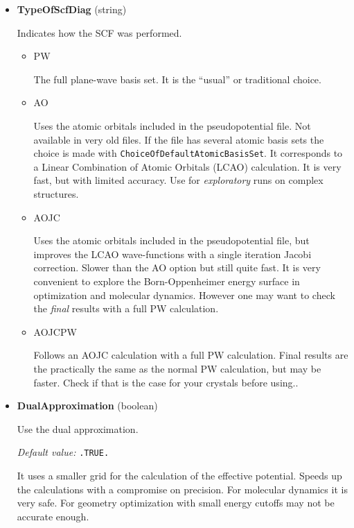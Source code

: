 \documentclass[11pt]{article}
\begin{document}
\begin{itemize}
  \textit{Default value:}  1.0

\item{\bf TypeOfScfDiag} (string)

  Indicates how the SCF was performed.

  \begin{itemize}

    \item{PW}

    The full plane-wave basis set.  It is the ``usual'' or traditional choice.

    \item{AO}

    Uses the atomic orbitals included in the pseudopotential file.  Not available in very
    old files.  If the file has several atomic basis sets the choice is made with
    \texttt{ChoiceOfDefaultAtomicBasisSet}.  It corresponds to a Linear Combination of Atomic Orbitals (LCAO) calculation.
    It is very fast, but with limited accuracy.  Use for {\it exploratory} runs
    on complex structures.

    \item{AOJC}

    Uses the atomic orbitals included in the pseudopotential file, but improves the LCAO
    wave-functions with a single iteration Jacobi correction.
    Slower than the AO option but still quite fast.
    It is very convenient to explore
    the Born-Oppenheimer energy surface in optimization and molecular dynamics.
    However one may want to check the {\it final} results with a full PW calculation.

    \item{AOJCPW}

    Follows an AOJC calculation with a full PW calculation.  Final results are the
    practically the same as the normal PW calculation, but may be faster.
    Check if that is the case for your crystals before using..

  \end{itemize}

\item{\bf DualApproximation} (boolean)

   Use the dual approximation.

  \textit{Default value:}  \texttt{.TRUE.}

   It uses a smaller grid for the calculation of the
   effective potential.  Speeds up the calculations with a compromise on precision.
   For molecular dynamics it is very safe.  For geometry optimization with small
   energy cutoffs may not be accurate enough.


\end{itemize}
\end{document}
